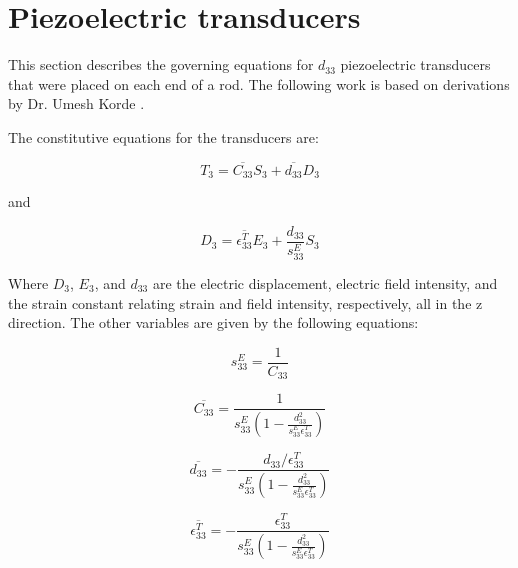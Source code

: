 \section{Piezoelectric transducers}

This section describes the governing equations for $d_{33}$ piezoelectric transducers that were placed on each end of a rod. The following work is based on derivations by Dr. Umesh Korde \cite{Fehrman2012}.

The constitutive equations for the transducers are:

\begin{equation}
T_3 = \overline{C_{33}} S_3 + \overline{d_{33}} D_3
\end{equation}

and 

\begin{equation}
D_3 = \overline{\epsilon ^T_{33}} E_3 + \frac{d_{33}}{s^E_{33}} S_3
\end{equation}


Where $D_3$, $E_3$, and $d_{33}$ are the electric displacement, electric field intensity, and the strain constant relating strain and field intensity, respectively, all in the z direction. The other variables are given by the following equations:

\begin{equation}
s^E_{33} = \frac{1}{C_{33}}
\end{equation}

\begin{equation}
\overline{C_{33}} = \frac{1}{s^E_{33}\left( 1 - \frac{d^2_{33}}{s^E_{33}\epsilon ^T_{33}}\right)}
\end{equation}

\begin{equation}
\overline{d_{33}} = -\frac{d_{33} / \epsilon ^T_{33}}{s^E_{33}\left(1 - \frac{d^2_{33}}{s^E_{33}\epsilon ^T_{33}}\right)}
\end{equation}

\begin{equation}
\overline{\epsilon ^T_{33}} = -\frac{\epsilon ^T_{33}}{s^E_{33}\left(1 - \frac{d^2_{33}}{s^E_{33}\epsilon ^T_{33}}\right)}
\end{equation}


